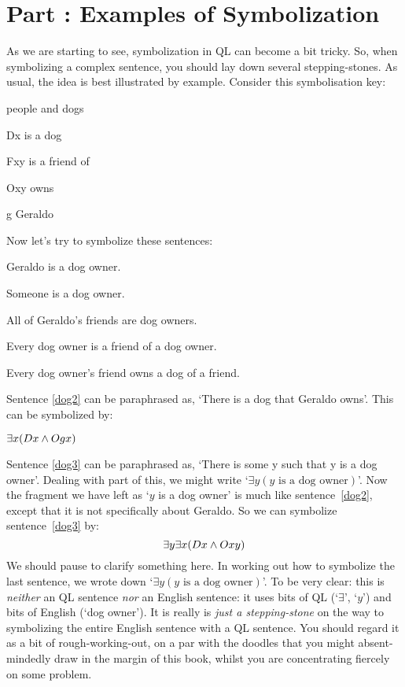 \chapter{Part \thechapcount: Examples of Symbolization}
As we are starting to see, symbolization in QL can become a bit tricky. So, when symbolizing a complex sentence, you should lay down several stepping-stones. As usual, the idea is best illustrated by example. Consider this symbolisation key: 
\begin{ekey}
\item[\text{domain}] people and dogs
\item[Dx]  is a dog
\item[Fxy]  is a friend of 
\item[Oxy]  owns 
\item[g] Geraldo
\end{ekey}
Now let's try to symbolize these sentences:
\begin{earg}
\item[\ex{dog2}] Geraldo is a dog owner.
\item[\ex{dog3}] Someone is a dog owner.
\item[\ex{dog4}] All of Geraldo's friends are dog owners.
\item[\ex{dog5}] Every dog owner is a friend of a dog owner.
\item[\ex{dog6}] Every dog owner's friend owns a dog of a friend.
\end{earg}
Sentence \ref{dog2} can be paraphrased as, `There is a dog that Geraldo owns'. This can be symbolized by: 
\begin{center}
$\exists x(Dx \wedge Ogx)$
\end{center}
Sentence \ref{dog3} can be paraphrased as, `There is some y such that y is a dog owner'. Dealing with part of this, we might write `$\exists y(y\text{ is a dog owner})$'. Now the fragment we have left as `$y$ is a dog owner' is much like sentence~\ref{dog2}, except that it is not specifically about Geraldo. So we can symbolize sentence~\ref{dog3} by:
$$\exists y \exists x(Dx \wedge Oxy)$$
We should pause to clarify something here. In working out how to symbolize the last sentence, we wrote down `$\exists y(y\text{ is a dog owner})$'. To be very clear: this is \emph{neither} an QL sentence \emph{nor} an English sentence: it uses bits of QL (`$\exists$', `$y$') and bits of English (`dog owner'). It is really is \emph{just a stepping-stone} on the way to symbolizing the entire English sentence with a QL sentence. You should regard it as a bit of rough-working-out, on a par with the doodles that you might absent-mindedly draw in the margin of this book, whilst you are concentrating fiercely on some problem.  

